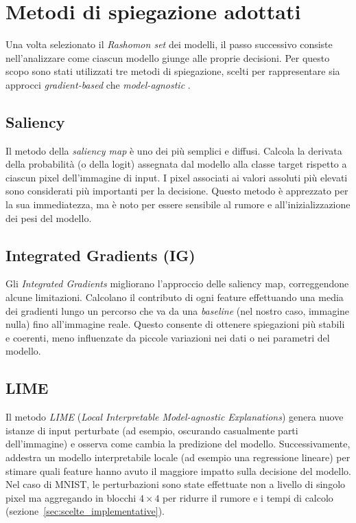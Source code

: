 \documentclass{article}
\begin{document}
\section{Metodi di spiegazione adottati}

Una volta selezionato il \emph{Rashomon set} dei modelli, il passo successivo
consiste nell’analizzare come ciascun modello giunge alle proprie decisioni.
Per questo scopo sono stati utilizzati tre metodi di spiegazione, scelti per
rappresentare sia approcci \emph{gradient-based} che \emph{model-agnostic}
\cite{adadi2018survey,guidotti2018survey}.

\subsection{Saliency}
Il metodo della \emph{saliency map} \cite{simonyan2013deep,samek2016evaluating}
è uno dei più semplici e diffusi. Calcola la derivata della probabilità (o
della logit) assegnata dal modello alla classe target rispetto a ciascun pixel
dell’immagine di input. I pixel associati ai valori assoluti più elevati sono
considerati più importanti per la decisione. Questo metodo è apprezzato per la
sua immediatezza, ma è noto per essere sensibile al rumore e
all’inizializzazione dei pesi del modello.

\subsection{Integrated Gradients (IG)}
Gli \emph{Integrated Gradients} \cite{sundararajan2017axiomatic} migliorano
l’approccio delle saliency map, correggendone alcune limitazioni. Calcolano il
contributo di ogni feature effettuando una media dei gradienti lungo un
percorso che va da una \emph{baseline} (nel nostro caso, immagine nulla) fino
all’immagine reale. Questo consente di ottenere spiegazioni più stabili e
coerenti, meno influenzate da piccole variazioni nei dati o nei parametri del
modello.

\subsection{LIME}
Il metodo \emph{LIME} (\emph{Local Interpretable Model-agnostic Explanations})
\cite{ribeiro2016lime} genera nuove istanze di input perturbate (ad esempio,
oscurando casualmente parti dell’immagine) e osserva come cambia la predizione
del modello. Successivamente, addestra un modello interpretabile locale (ad
esempio una regressione lineare) per stimare quali feature hanno avuto il
maggiore impatto sulla decisione del modello. Nel caso di MNIST, le
perturbazioni sono state effettuate non a livello di singolo pixel ma
aggregando in blocchi $4\times4$ per ridurre il rumore e i tempi di calcolo
(sezione~\ref{sec:scelte_implementative}).
\end{document}
